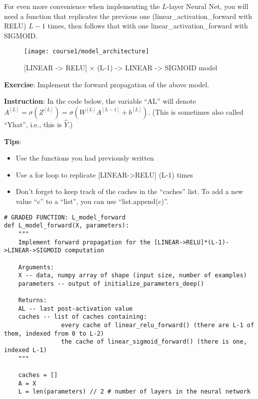 {

For even more convenience when implementing the $L$-layer Neural Net, you will need a function that replicates the previous one (linear\_activation\_forward with RELU) $L-1$ times, then follows that with one linear\_activation\_forward with SIGMOID.

\begin{figure}[h]
\begin{center}
\texttt{[image: course1/model\_architecture]}
\end{center}
\caption{[LINEAR -> RELU] $\times$ (L-1) -> LINEAR -> SIGMOID model}
\label{fig:final_outline}
\end{figure}

{\textbf {Exercise}}: Implement the forward propagation of the above model.

{\textbf {Instruction}}: In the code below, the variable ``AL'' will denote $A^{[L]} = \sigma(Z^{[L]}) = \sigma(W^{[L]} A^{[L-1]} + b^{[L]})$. (This is sometimes also called ``Yhat'', i.e., this is $\hat{Y}$.) 

{\textbf {Tips}}:
\begin{itemize}
\item Use the functions you had previously written 
\item Use a for loop to replicate [LINEAR->RELU] (L-1) times
\item Don't forget to keep track of the caches in the ``caches'' list. To add a new value ``c'' to a ``list'', you can use ``list.append(c)''.
\end{itemize}

\begin{verbatim}
# GRADED FUNCTION: L_model_forward
def L_model_forward(X, parameters):
    """
    Implement forward propagation for the [LINEAR->RELU]*(L-1)->LINEAR->SIGMOID computation
    
    Arguments:
    X -- data, numpy array of shape (input size, number of examples)
    parameters -- output of initialize_parameters_deep()
    
    Returns:
    AL -- last post-activation value
    caches -- list of caches containing:
                every cache of linear_relu_forward() (there are L-1 of them, indexed from 0 to L-2)
                the cache of linear_sigmoid_forward() (there is one, indexed L-1)
    """

    caches = []
    A = X
    L = len(parameters) // 2 # number of layers in the neural network
    

\end{verbatim}}
